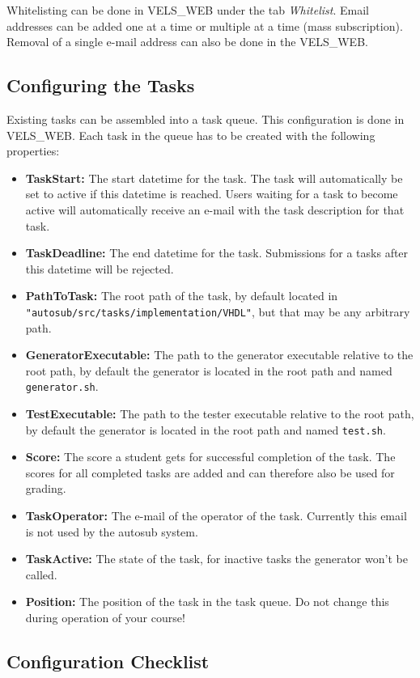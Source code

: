 Whitelisting can be done in VELS\_WEB under the tab {\it Whitelist}. Email addresses can be added
one at a time or multiple at a time (mass subscription). Removal of a single e-mail address
can also be done in the VELS\_WEB.

\subsection{Configuring the Tasks} \label{sub:configTasks}
Existing tasks can be assembled into a task queue. This configuration is done in VELS\_WEB.
Each task in the queue has to be created with the following properties:
\begin{itemize}
\item {\bf TaskStart:} The start datetime for the task. The task will automatically
    be set to active if this datetime is reached. Users waiting for a task to become
    active will automatically receive an e-mail with the task description for that task.
\item {\bf TaskDeadline:} The end datetime for the task. Submissions for a tasks after
    this datetime will be rejected.
\item {\bf PathToTask:} The root path of the task, by default located in
    {\tt "autosub/src/tasks/implementation/VHDL"}, but that may be any arbitrary path.
\item {\bf GeneratorExecutable:} The path to the generator executable relative to the
    root path, by default the generator is located in the root path and named
    {\tt generator.sh}.
\item {\bf TestExecutable:} The path to the tester executable relative to the root path,
    by default the generator is located in the root path and named {\tt test.sh}.
\item {\bf Score:} The score a student gets for successful completion of the task. The
    scores for all completed tasks are added and can therefore also be used for grading.
\item {\bf TaskOperator:} The e-mail of the operator of the task. Currently this email
    is not used by the autosub system.
\item {\bf TaskActive:} The state of the task, for inactive tasks the generator won't
    be called.
\item {\bf Position:} The position of the task in the task queue. Do not change
    this during operation of your course!
\end{itemize}

\subsection{Configuration Checklist} \label{sub:configChecklist}

